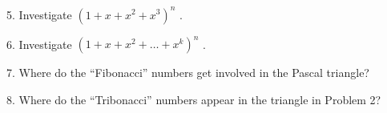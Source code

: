 \documentclass[10pt,]{book}
\theoremstyle{plain}
\theoremstyle{definition}
\theoremstyle{definition}
\theoremstyle{definition}
\numberwithin{equation}{chapter}
\begin{document}
\begin{exerciselist}
\par\smallskip
\item[5.]\hypertarget{exercise-31}{}\hypertarget{p-1709}{}%
Investigate \(\left( 1 + x + x^{2} + x^{3} \right)^{n}\) .%
\par\smallskip
\item[6.]\hypertarget{exercise-32}{}\hypertarget{p-1710}{}%
Investigate \(\left( 1 + x + x^{2} + \ldots + x^{k} \right)^{n}\) .%
\par\smallskip
\item[7.]\hypertarget{exercise-33}{}\hypertarget{p-1711}{}%
Where do the ``Fibonacci'' numbers get involved in the Pascal triangle?%
\par\smallskip
\item[8.]\hypertarget{exercise-34}{}\hypertarget{p-1712}{}%
Where do the ``Tribonacci'' numbers appear in the triangle in Problem 2?%
\par\smallskip
\end{exerciselist}
\typeout{************************************************}
\typeout{************************************************}
\end{document}
